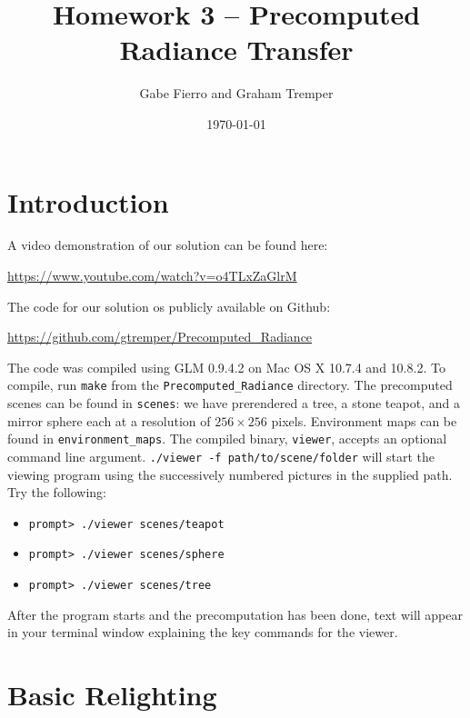 \documentclass[11pt]{article}
\begin{document}
\title{Homework 3 -- Precomputed Radiance Transfer}
\author{Gabe Fierro and Graham Tremper}
\date{\today}
\maketitle

\section{Introduction}

A video demonstration of our solution can be found here:

\begin{center}
  \href{https://www.youtube.com/watch?v=o4TLxZaGlrM}{https://www.youtube.com/watch?v=o4TLxZaGlrM}
\end{center}

The code for our solution os publicly available on Github:

\begin{center}
  \href{https://github.com/gtremper/Precomputed\_Radiance}{https://github.com/gtremper/Precomputed\_Radiance}
\end{center}

The code was compiled using GLM 0.9.4.2 on Mac OS X 10.7.4 and 10.8.2. To
compile, run \verb'make' from the \verb'Precomputed_Radiance' directory. The
precomputed scenes can be found in \verb'scenes': we have prerendered a tree, a
stone teapot, and a mirror sphere each at a resolution of $256\times 256$
pixels. Environment maps can be found in \verb'environment_maps'. The compiled
binary, \verb'viewer', accepts an optional command line argument. \verb'./viewer -f path/to/scene/folder' will start the viewing program using the successively
numbered pictures in the supplied path. Try the following:

\begin{itemize}
    \item \verb`prompt> ./viewer scenes/teapot`
    \item \verb`prompt> ./viewer scenes/sphere`
    \item \verb`prompt> ./viewer scenes/tree`
\end{itemize}

After the program starts and the precomputation has been done, text will appear
in your terminal window explaining the key commands for the viewer.

\section{Basic Relighting}
\end{document}
